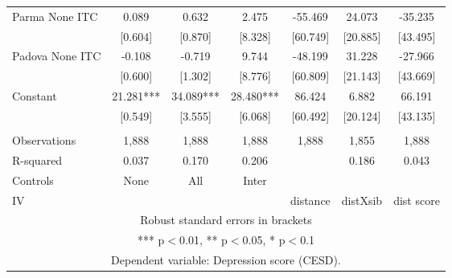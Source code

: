 \begin{tabular}{lcccccc}
Parma None ITC & 0.089 & 0.632 & 2.475 & -55.469 & 24.073 & -35.235 \\
 & [0.604] & [0.870] & [8.328] & [60.749] & [20.885] & [43.495] \\
Padova None ITC & -0.108 & -0.719 & 9.744 & -48.199 & 31.228 & -27.966 \\
 & [0.600] & [1.302] & [8.776] & [60.809] & [21.143] & [43.669] \\
Constant & 21.281*** & 34.089*** & 28.480*** & 86.424 & 6.882 & 66.191 \\
 & [0.549] & [3.555] & [6.068] & [60.492] & [20.124] & [43.135] \\
 &  &  &  &  &  &  \\
Observations & 1,888 & 1,888 & 1,888 & 1,888 & 1,855 & 1,888 \\
R-squared & 0.037 & 0.170 & 0.206 &  & 0.186 & 0.043 \\
Controls & None & All & Inter &  &  &  \\
 IV &  &  &  & distance & distXsib & dist score \\ \hline
\multicolumn{7}{c}{ Robust standard errors in brackets} \\
\multicolumn{7}{c}{ *** p$<$0.01, ** p$<$0.05, * p$<$0.1} \\
\multicolumn{7}{c}{ Dependent variable: Depression score (CESD).} \\
\end{tabular}
